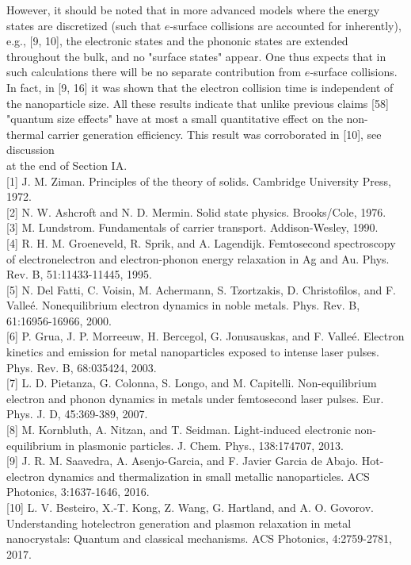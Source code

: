 \documentclass[10pt]{article}
\begin{document}
However, it should be noted that in more advanced models where the energy states are discretized (such that $e$-surface collisions are accounted for inherently), e.g., [9, 10], the electronic states and the phononic states are extended throughout the bulk, and no "surface states" appear. One thus expects that in such calculations there will be no separate contribution from $e$-surface collisions. In fact, in [9, 16] it was shown that the electron collision time is independent of the nanoparticle size. All these results indicate that unlike previous claims [58] "quantum size effects" have at most a small quantitative effect on the non-thermal carrier generation efficiency. This result was corroborated in [10], see discussion\\
at the end of Section IA.\\[0pt]
[1] J. M. Ziman. Principles of the theory of solids. Cambridge University Press, 1972.\\[0pt]
[2] N. W. Ashcroft and N. D. Mermin. Solid state physics. Brooks/Cole, 1976.\\[0pt]
[3] M. Lundstrom. Fundamentals of carrier transport. Addison-Wesley, 1990.\\[0pt]
[4] R. H. M. Groeneveld, R. Sprik, and A. Lagendijk. Femtosecond spectroscopy of electronelectron and electron-phonon energy relaxation in Ag and Au. Phys. Rev. B, 51:11433-11445, 1995.\\[0pt]
[5] N. Del Fatti, C. Voisin, M. Achermann, S. Tzortzakis, D. Christofilos, and F. Valleé. Nonequilibrium electron dynamics in noble metals. Phys. Rev. B, 61:16956-16966, 2000.\\[0pt]
[6] P. Grua, J. P. Morreeuw, H. Bercegol, G. Jonusauskas, and F. Valleé. Electron kinetics and emission for metal nanoparticles exposed to intense laser pulses. Phys. Rev. B, 68:035424, 2003.\\[0pt]
[7] L. D. Pietanza, G. Colonna, S. Longo, and M. Capitelli. Non-equilibrium electron and phonon dynamics in metals under femtosecond laser pulses. Eur. Phys. J. D, 45:369-389, 2007.\\[0pt]
[8] M. Kornbluth, A. Nitzan, and T. Seidman. Light-induced electronic non-equilibrium in plasmonic particles. J. Chem. Phys., 138:174707, 2013.\\[0pt]
[9] J. R. M. Saavedra, A. Asenjo-Garcia, and F. Javier Garcia de Abajo. Hot-electron dynamics and thermalization in small metallic nanoparticles. ACS Photonics, 3:1637-1646, 2016.\\[0pt]
[10] L. V. Besteiro, X.-T. Kong, Z. Wang, G. Hartland, and A. O. Govorov. Understanding hotelectron generation and plasmon relaxation in metal nanocrystals: Quantum and classical mechanisms. ACS Photonics, 4:2759-2781, 2017.\\[0pt]
\end{document}
